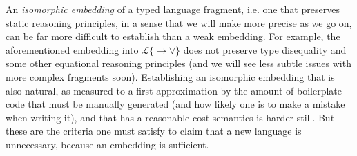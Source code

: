 %



An \emph{isomorphic embedding} of a typed language fragment, i.e. one that preserves static reasoning principles, in a sense that we will make more precise as we go on, can be far more difficult to establish than a weak embedding. For example, the aforementioned embedding into $\mathcal{L}\{\rightarrow\forall\}$ does not preserve type disequality and some other equational reasoning principles (and we will see less subtle issues with more complex fragments soon). Establishing an isomorphic embedding that is also natural, as measured to a first approximation by the amount of boilerplate code that must be manually generated (and how likely one is to make a mistake when writing it), and that has a reasonable cost semantics is harder still. But these are the criteria one must satisfy to claim that a new language is unnecessary, because an embedding is sufficient.

